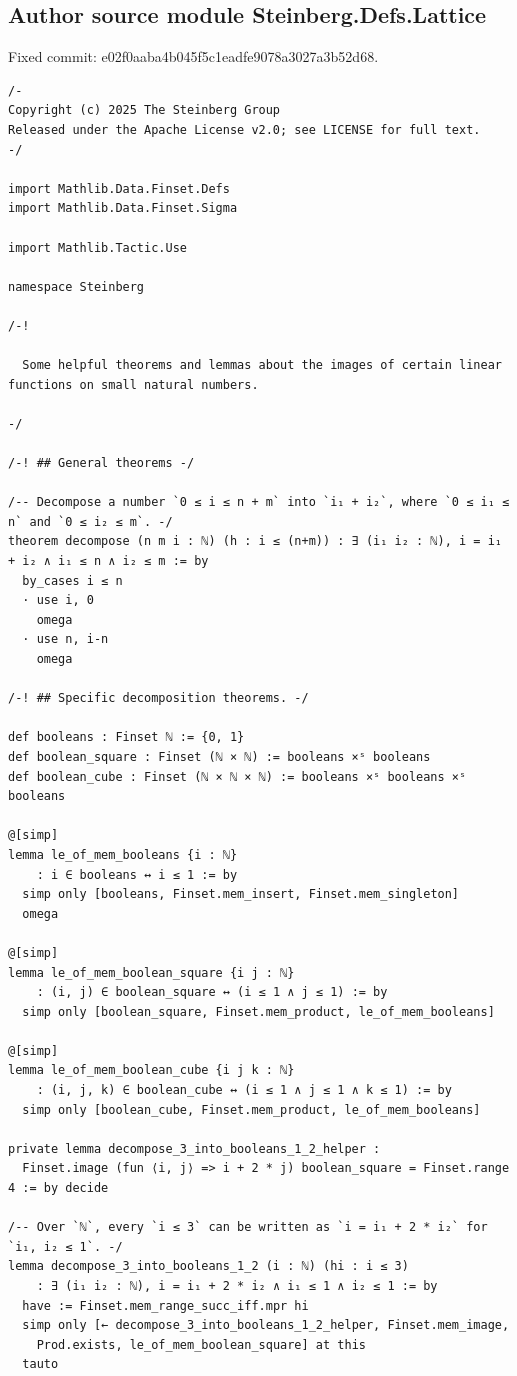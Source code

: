 \subsection*{Author source module Steinberg.Defs.Lattice}
\noindent Fixed commit: e02f0aaba4b045f5c1eadfe9078a3027a3b52d68.
\begin{Verbatim}
/-
Copyright (c) 2025 The Steinberg Group
Released under the Apache License v2.0; see LICENSE for full text.
-/

import Mathlib.Data.Finset.Defs
import Mathlib.Data.Finset.Sigma

import Mathlib.Tactic.Use

namespace Steinberg

/-!

  Some helpful theorems and lemmas about the images of certain linear functions on small natural numbers.

-/

/-! ## General theorems -/

/-- Decompose a number `0 ≤ i ≤ n + m` into `i₁ + i₂`, where `0 ≤ i₁ ≤ n` and `0 ≤ i₂ ≤ m`. -/
theorem decompose (n m i : ℕ) (h : i ≤ (n+m)) : ∃ (i₁ i₂ : ℕ), i = i₁ + i₂ ∧ i₁ ≤ n ∧ i₂ ≤ m := by
  by_cases i ≤ n
  · use i, 0
    omega
  · use n, i-n
    omega

/-! ## Specific decomposition theorems. -/

def booleans : Finset ℕ := {0, 1}
def boolean_square : Finset (ℕ × ℕ) := booleans ×ˢ booleans
def boolean_cube : Finset (ℕ × ℕ × ℕ) := booleans ×ˢ booleans ×ˢ booleans

@[simp]
lemma le_of_mem_booleans {i : ℕ}
    : i ∈ booleans ↔ i ≤ 1 := by
  simp only [booleans, Finset.mem_insert, Finset.mem_singleton]
  omega

@[simp]
lemma le_of_mem_boolean_square {i j : ℕ}
    : (i, j) ∈ boolean_square ↔ (i ≤ 1 ∧ j ≤ 1) := by
  simp only [boolean_square, Finset.mem_product, le_of_mem_booleans]

@[simp]
lemma le_of_mem_boolean_cube {i j k : ℕ}
    : (i, j, k) ∈ boolean_cube ↔ (i ≤ 1 ∧ j ≤ 1 ∧ k ≤ 1) := by
  simp only [boolean_cube, Finset.mem_product, le_of_mem_booleans]

private lemma decompose_3_into_booleans_1_2_helper :
  Finset.image (fun ⟨i, j⟩ => i + 2 * j) boolean_square = Finset.range 4 := by decide

/-- Over `ℕ`, every `i ≤ 3` can be written as `i = i₁ + 2 * i₂` for `i₁, i₂ ≤ 1`. -/
lemma decompose_3_into_booleans_1_2 (i : ℕ) (hi : i ≤ 3)
    : ∃ (i₁ i₂ : ℕ), i = i₁ + 2 * i₂ ∧ i₁ ≤ 1 ∧ i₂ ≤ 1 := by
  have := Finset.mem_range_succ_iff.mpr hi
  simp only [← decompose_3_into_booleans_1_2_helper, Finset.mem_image,
    Prod.exists, le_of_mem_boolean_square] at this
  tauto


\end{Verbatim}
